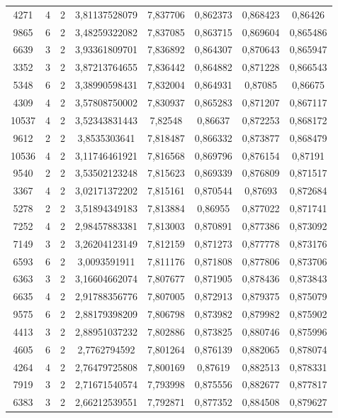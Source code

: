 \begin{longtable}{|c|c|c|c|c|c|c|c|}
4271 & 4 & 2 & 3,81137528079 & 7,837706 & 0,862373 & 0,868423 & 0,86426 \\
9865 & 6 & 2 & 3,48259322082 & 7,837085 & 0,863715 & 0,869604 & 0,865486 \\
6639 & 3 & 2 & 3,93361809701 & 7,836892 & 0,864307 & 0,870643 & 0,865947 \\
3352 & 3 & 2 & 3,87213764655 & 7,836442 & 0,864882 & 0,871228 & 0,866543 \\
5348 & 6 & 2 & 3,38990598431 & 7,832004 & 0,864931 & 0,87085 & 0,86675 \\
4309 & 4 & 2 & 3,57808750002 & 7,830937 & 0,865283 & 0,871207 & 0,867117 \\
10537 & 4 & 2 & 3,52343831443 & 7,82548 & 0,86637 & 0,872253 & 0,868172 \\
9612 & 2 & 2 & 3,8535303641 & 7,818487 & 0,866332 & 0,873877 & 0,868479 \\
10536 & 4 & 2 & 3,11746461921 & 7,816568 & 0,869796 & 0,876154 & 0,87191 \\
9540 & 2 & 2 & 3,53502123248 & 7,815623 & 0,869339 & 0,876809 & 0,871517 \\
3367 & 4 & 2 & 3,02171372202 & 7,815161 & 0,870544 & 0,87693 & 0,872684 \\
5278 & 2 & 2 & 3,51894349183 & 7,813884 & 0,86955 & 0,877022 & 0,871741 \\
7252 & 4 & 2 & 2,98457883381 & 7,813003 & 0,870891 & 0,877386 & 0,873092 \\
7149 & 3 & 2 & 3,26204123149 & 7,812159 & 0,871273 & 0,877778 & 0,873176 \\
6593 & 6 & 2 & 3,0093591911 & 7,811176 & 0,871808 & 0,877806 & 0,873706 \\
6363 & 3 & 2 & 3,16604662074 & 7,807677 & 0,871905 & 0,878436 & 0,873843 \\
6635 & 4 & 2 & 2,91788356776 & 7,807005 & 0,872913 & 0,879375 & 0,875079 \\
9575 & 6 & 2 & 2,88179398209 & 7,806798 & 0,873982 & 0,879982 & 0,875902 \\
4413 & 3 & 2 & 2,88951037232 & 7,802886 & 0,873825 & 0,880746 & 0,875996 \\
4605 & 6 & 2 & 2,7762794592 & 7,801264 & 0,876139 & 0,882065 & 0,878074 \\
4264 & 4 & 2 & 2,76479725808 & 7,800169 & 0,87619 & 0,882513 & 0,878331 \\
7919 & 3 & 2 & 2,71671540574 & 7,793998 & 0,875556 & 0,882677 & 0,877817 \\
6383 & 3 & 2 & 2,66212539551 & 7,792871 & 0,877352 & 0,884508 & 0,879627 \\

\end{longtable}
